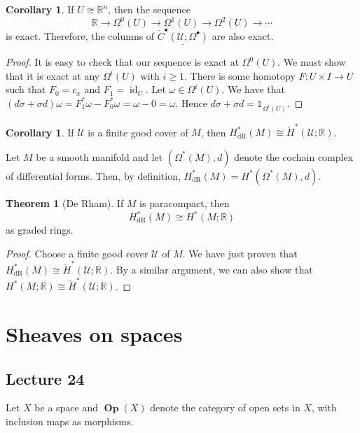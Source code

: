 \documentclass[10pt,letterpaper,cm]{nupset}
\theoremstyle{definition}
\theoremstyle{theorem}
\newtheorem{theorem}[definition]{Theorem}
\newtheorem{corollary}[definition]{Corollary}
\theoremstyle{remark}
\newcommand{\U}{\mathcal U}
\newcommand{\R}{\mathbb{R}}
\newcommand{\1}{\mathbb{1}}
\newcommand{\0}{\vec 0}
\DeclareMathOperator{\id}{id}
\DeclareMathOperator{\dr}{dR}
\DeclareMathOperator{\Op}{\mathbf{Op}}
\begin{document}
\begin{corollary}
If $U \cong \R^n$, then the sequence $$\R \to \Omega^0(U) \to \Omega^1(U) \to \Omega^2(U) \to \cdots$$ is exact. Therefore, the columns of $\underline{\check{C}^{\bullet}(\U; \Omega^{\bullet})}$ are also exact.
\end{corollary}
\begin{proof}
It is easy to check that our sequence is exact at $\Omega^0(U)$. We must show that it is exact at any $\Omega^i(U)$ with $i\geq 1$. There is some homotopy $F: U \times I  \to U$ such that $F_0 = c_x$ and $F_1 = \id_U$.  Let $\omega \in \Omega^i(U)$. We have that $\left(d \sigma + \sigma d\right) \omega = F_1^{\ast} \omega - F_0^{\ast} \omega = \omega -0 =\omega$. Hence $d \sigma + \sigma d = \1_{\Omega^i(U)}$.
\end{proof}

\begin{corollary}
 If $\U$ is a finite good cover of $M$, then $H^{\ast}_{\dr}(M) \cong  \check{H}^{\ast}(\U; \R)$.
\end{corollary}

\smallskip

Let $M$ be a smooth manifold and let $\left(\Omega^{\ast}(M), d\right)$ denote the cochain complex of differential forms. Then, by definition, $H_{\dr}^{\ast}(M) = H^{\ast}(\Omega^{\ast}(M), d)$. 

\begin{theorem}[De Rham]
 If $M$ is  paracompact, then $$H^{\ast}_{\dr}(M) \cong H^{\ast}(M; \R)$$ as graded rings.
\end{theorem}
\begin{proof}
Choose a finite good cover $\U$ of $M$. We have just proven that $H^{\ast}_{\dr}(M) \cong  \check{H}^{\ast}(\U; \R)$. By a similar argument, we can also show that $H^{\ast}(M; \R) \cong \check{H}^{\ast}(\U; \R)$.
\end{proof}

\section{Sheaves on spaces}

\subsection{Lecture 24}

Let $X$ be a space and $\Op(X)$ denote the category of open sets in $X$, with inclusion maps as morphisms.
\end{document}
